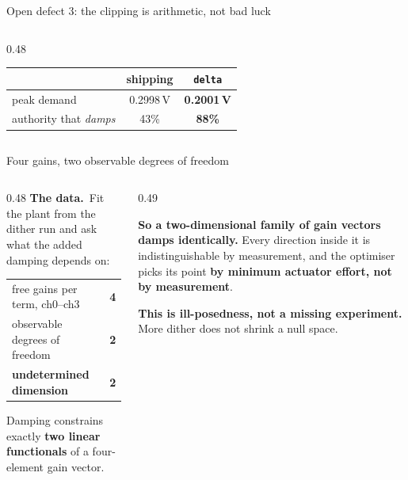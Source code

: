 \documentclass[aspectratio=169]{beamer}
\newcommand{\rawdata}{\textbf{The data.}}
\begin{document}
\begin{frame}{Open defect 3: the clipping is arithmetic, not bad luck}
\begin{columns}[T]
\begin{column}{0.48\textwidth}
      \vspace{1mm}
      \centering
      {\footnotesize
      \begin{tabular}{@{}lcc@{}}
        \toprule
        & shipping & \textbf{\texttt{delta}} \\
        \midrule
        peak demand & 0.2998\,V & \textbf{0.2001\,V} \\
        authority that \emph{damps} & 43\% & \textbf{88\%} \\
        \bottomrule
      \end{tabular}}
    \end{column}
  \end{columns}
\end{frame}

\begin{frame}{Four gains, two observable degrees of freedom}
  \begin{columns}[T]
    \begin{column}{0.48\textwidth}
      \footnotesize
      \rawdata\ Fit the plant from the dither run and ask what the added damping
      depends on:

      \vspace{1.5mm}
      \centering
      {\footnotesize
      \begin{tabular}{@{}lc@{}}
        \toprule
        free gains per term, ch0--ch3 & \textbf{4} \\
        observable degrees of freedom & \textbf{2} \\
        \midrule
        \textbf{undetermined dimension} & \textbf{2} \\
        \bottomrule
      \end{tabular}}

      \vspace{2mm}
      \raggedright
      Damping constrains exactly \textbf{two linear functionals} of a
      four-element gain vector.
    \end{column}
    \begin{column}{0.49\textwidth}
      \footnotesize\raggedright
      \alert{\textbf{So a two-dimensional family of gain vectors damps
      identically.}} Every direction inside it is indistinguishable by
      measurement, and the optimiser picks its point \textbf{by minimum actuator
      effort, not by measurement}.

      \vspace{2mm}
      \textbf{This is ill-posedness, not a missing experiment.} More dither does
      not shrink a null space.


\end{column}
\end{columns}
\end{frame}
\end{document}
